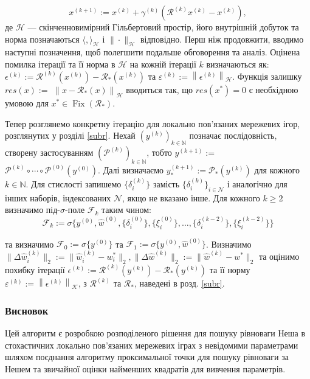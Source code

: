 \documentclass[a4paper]{article}
\begin{document}
\begin{equation}
x^{(k+1)}:=x^{(k)}+\gamma^{(k)}\left(\mathscr{R}^{(k)} x^{(k)}-x ^{(k)}\right),
\end{equation}
де $\mathcal{H}$ — скінченновимірний Гільбертовий простір, його внутрішній добуток та норма позначаються $\langle,\rangle_{\mathcal{H}}$ і $\|\cdot\|_{\mathcal {H}}$ відповідно. Перш ніж продовжити, вводимо наступні позначення, щоб полегшити подальше обговорення та аналіз. Оцінена помилка ітерації та її норма в $\mathcal{H}$ на кожній ітерації $k$ визначаються як: $\epsilon^{(k)}:=\mathscr{R}^{(k)}\left( x^{(k)}\right)-\mathscr{R}_{*}\left(x^{(k)}\right)$ та $\varepsilon^{(k)}:=\left\| \epsilon^{(k)}\right\|_{\mathcal{H}}$. Функція залишку $res(x):=$ $\left\|x-\mathscr{R}_{*}(x)\right\|_{\mathcal{H}}$ вводиться так, що $res(x^{*})=0$ є необхідною умовою для $x^{*} \in \operatorname{Fix}\left(\mathscr{R}_{*}\right)$.

Тепер розглянемо конкретну ітерацію для локально пов’язаних мережевих ігор, розглянутих у розділі \ref{subr}. Нехай $(y^{(k)})_{k \in \mathbb{N}}$ позначає послідовність, створену застосуванням $(\mathscr{P}^{(k)})_{k \in \mathbb{N}}$, тобто $y^{(k+1)}:=$ $\mathscr{P}^{(k)} \circ \cdots \circ \mathscr{ P}^{(0)}(y^{(0)})$. Далі визначаємо $y_{*}^{(k+1)}:=\mathscr{P}_{*}(y^{(k)})$ для кожного $k \in \mathbb{ N}$. Для стислості запишемо $\{\delta_{i}^{(k)}\}$ замість $\{\delta_{i}^{(k)}\} _{i \in \mathcal{N}}$ і аналогічно для інших наборів, індексованих $\mathcal{N}$, якщо не вказано інше. Для кожного $k \geq 2$ визначимо під-$\sigma$-поле $\mathcal{F}_{k}$ таким чином:
\begin{equation}
    \mathcal{F}_k := \sigma\{y^{(0)}, \hat{w}^{(0)},\{\delta_{i}^{(0 )}\},\{\xi_{i}^{(0)}\}, \ldots,\{\delta_{i}^{(k-2)}\},\{\xi_{i}^{(k-2)}\}\}
\end{equation}

та визначимо $\mathcal{F}_{0}:=\sigma\{y^{(0)}\}$ та $\mathcal{F}_{1}:=\sigma\{y^{(0)}, \hat{w}^{(0)}\}$. Визначимо $\|\Delta \hat{w}_{i}^{(k)}\|_{2}:=\|\hat{w}_{i}^{(k )}-w_{i}^{*}\|_{2},\|\Delta \hat{w}^{(k)}\|_{2}:=\|\hat{w}^{(k)}-w^{*}\|_{2}$ та оцінимо похибку ітерації $\epsilon^{(k)} := \mathscr{R}^{(k)}\left(y^{(k)}\right)-\mathscr{R}_{*}\left(y^{(k)}\right)$ та її норму $\varepsilon^{(k)}:=\left\|\epsilon^{(k)}\right\|_{\mathcal{K}}$, з $\mathscr{R}^{(k )}$ та $\mathscr{R}_{*}$, наведені в розд. \ref{subr}.

\clearpage
\subsubsection*{Висновок}
Цей алгоритм є розробкою розподіленого рішення для пошуку рівноваги Неша в стохастичних локально пов’язаних мережевих іграх з невідомими параметрами шляхом поєднання алгоритму проксимальної точки для пошуку рівноваги за Нешем та звичайної оцінки найменших квадратів для вивчення параметрів.
\end{document}
